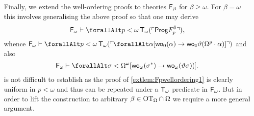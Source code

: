 \documentclass[UKenglish,cleveref,DIV=12]{scrartcl}
\let\forall\forallAlt
\theoremstyle{definition}
\theoremstyle{definition}
\begin{document}
Finally, we extend the well-ordering proofs to theories $\mathsf{F}_\beta$ for
$\beta\ge\omega$. For $\beta=\omega$ this involves generalising the above proof
so that one may derive
\begin{align}\label{exteqn:Fbetawellordering0.1}
  \F_\omega\proves\forall p<\omega\,\T_\omega(\gn{\Prog F_p^{\bar0}}),
\end{align}
whence $\F_\omega \proves\forall
p<\omega\,\T_\omega(\gn{\forall\alpha[\wo_{0}(\alpha)\rightarrow\wo_{0}
\vartheta(\Omega^p\cdot\alpha)]})$ and also
\begin{align*}
  \F_\omega\proves \forall\sigma<\Omega^\omega[\wo_\omega(\sigma^*)\rightarrow
  \wo_\omega(\vartheta\sigma))].
\end{align*}
 is not difficult to establish as the proof of
\cref{extlem:Fpwellordering1} is clearly uniform in $p<\omega$ and thus can be
repeated under a $\mathsf{T}_\omega$ predicate in $\mathsf{F}_\omega$. But in order to lift the
construction to arbitrary $\beta\in\mathrm{OT}_\Omega\cap\Omega$ we require a more
general argument.
\end{document}
